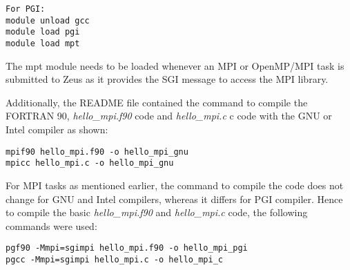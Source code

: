 \begin{tcolorbox}
\begin{Verbatim}[fontsize=\scriptsize]
For PGI:
module unload gcc
module load pgi
module load mpt
\end{Verbatim}
\end{tcolorbox}

The mpt module needs to be loaded whenever an MPI or OpenMP/MPI task is submitted to Zeus as it provides the SGI message to access the MPI library.

Additionally, the README file contained the command to compile the FORTRAN 90, \emph{hello\_mpi.f90} code and \emph{hello\_mpi.c} c code with the GNU or
Intel compiler as shown:

\begin{tcolorbox}
\begin{Verbatim}[fontsize=\scriptsize]
mpif90 hello_mpi.f90 -o hello_mpi_gnu
mpicc hello_mpi.c -o hello_mpi_gnu
\end{Verbatim}
\end{tcolorbox}

For MPI tasks as mentioned earlier, the command to compile the code does not change for GNU and Intel compilers, whereas it differs for PGI compiler.
Hence to compile the basic \emph{hello\_mpi.f90} and \emph{hello\_mpi.c} code, the following commands were used:

\begin{tcolorbox}
\begin{Verbatim}[fontsize=\scriptsize]
pgf90 -Mmpi=sgimpi hello_mpi.f90 -o hello_mpi_pgi
pgcc -Mmpi=sgimpi hello_mpi.c -o hello_mpi_c 
\end{Verbatim}
\end{tcolorbox}

